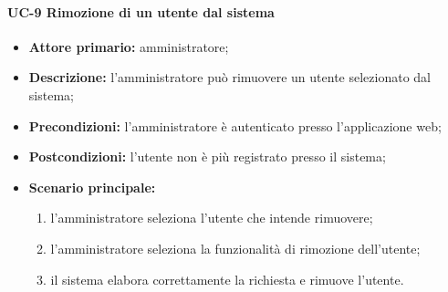 \paragraph{UC-9 Rimozione di un utente dal sistema}
\begin{itemize}
    \item \textbf{Attore primario:} amministratore;

    \item \textbf{Descrizione:} l'amministratore può rimuovere un utente selezionato dal sistema;

    \item \textbf{Precondizioni:} l'amministratore è autenticato presso l'applicazione web;

    \item \textbf{Postcondizioni:} l'utente non è più registrato presso il sistema;

    \item \textbf{Scenario principale:}
          \begin{enumerate}
              \item l'amministratore seleziona l'utente che intende rimuovere;
              \item l'amministratore seleziona la funzionalità di rimozione dell'utente;
              \item il sistema elabora correttamente la richiesta e rimuove l'utente.
          \end{enumerate}
\end{itemize}